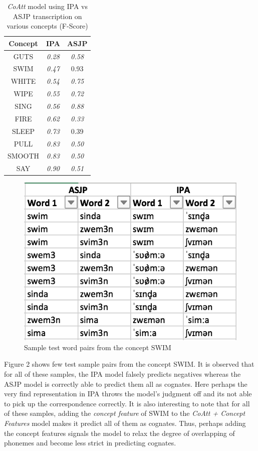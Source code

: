 \documentclass[11pt,letterpaper]{article}
\begin{document}
\begin{table}[h]
\centering
\begin{tabular}{ccc}
\textbf{Concept} & \textbf{IPA}  & \textbf{ASJP} \\ \hline
GUTS             & \textit{0.28} & \textit{0.58} \\
SWIM             & \textit{0.47} & 0.93          \\
WHITE            & \textit{0.54} & \textit{0.75} \\
WIPE             & \textit{0.55} & \textit{0.72} \\
SING             & \textit{0.56} & \textit{0.88} \\ \hline
FIRE             & \textit{0.62} & \textit{0.33} \\
SLEEP            & \textit{0.73} & 0.39          \\
PULL             & \textit{0.83} & \textit{0.50} \\
SMOOTH           & \textit{0.83} & \textit{0.50} \\
SAY              & \textit{0.90} & \textit{0.51}
\end{tabular}
\caption{\textit{CoAtt} model using IPA vs ASJP transcription on various concepts (F-Score)}
\end{table}

\begin{figure}[t]
\centering
  \includegraphics[width=.9\linewidth]{swim}
  \caption{Sample test word pairs from the concept SWIM}
  \label{disssim}
\end{figure}

Figure 2 shows few test sample pairs from the concept SWIM. It is observed that for all of these samples, the IPA model falsely predicts negatives whereas the ASJP model is correctly able to predict them all as cognates. Here perhaps the very find representation in IPA throws the model's judgment off and its not able to pick up the correspondence correctly. It is also interesting to note that for all of these samples, adding the \textit{concept feature} of SWIM to the \textit{CoAtt + Concept Features} model makes it predict all of them as cognates. Thus, perhaps adding the concept features signals the model to relax the degree of overlapping of phonemes and become less strict in predicting cognates.
\end{document}
